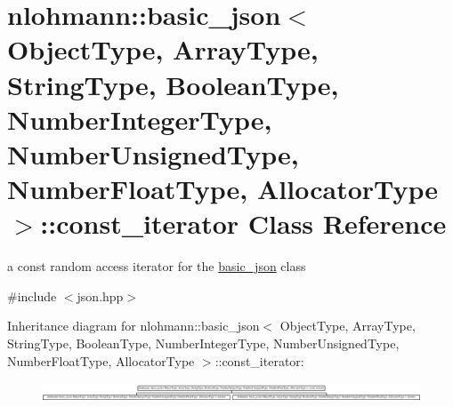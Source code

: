 \hypertarget{classnlohmann_1_1basic__json_1_1const__iterator}{\section{nlohmann\-:\-:basic\-\_\-json$<$ Object\-Type, Array\-Type, String\-Type, Boolean\-Type, Number\-Integer\-Type, Number\-Unsigned\-Type, Number\-Float\-Type, Allocator\-Type $>$\-:\-:const\-\_\-iterator Class Reference}
\label{classnlohmann_1_1basic__json_1_1const__iterator}
}


a const random access iterator for the \hyperlink{classnlohmann_1_1basic__json}{basic\-\_\-json} class  




{\ttfamily \#include $<$json.\-hpp$>$}

Inheritance diagram for nlohmann\-:\-:basic\-\_\-json$<$ Object\-Type, Array\-Type, String\-Type, Boolean\-Type, Number\-Integer\-Type, Number\-Unsigned\-Type, Number\-Float\-Type, Allocator\-Type $>$\-:\-:const\-\_\-iterator\-:\begin{figure}[H]
\begin{center}
\leavevmode
\includegraphics[height=0.568528cm]{d0/d12/classnlohmann_1_1basic__json_1_1const__iterator}
\end{center}
\end{figure}
